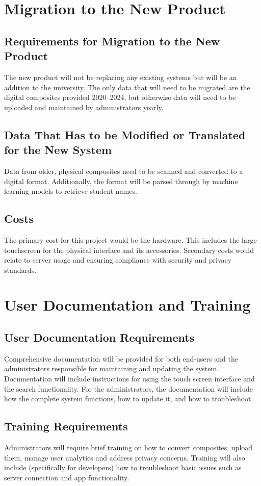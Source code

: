 \documentclass[12pt]{article}
\begin{document}
\section{Migration to the New Product}

\subsection*{Requirements for Migration to the New Product}
The new product will not be replacing any existing systems but will be an addition to the university. The only data that will need to be migrated are the digital composites provided 2020--2024, but otherwise data will need to be uploaded and maintained by administrators yearly.

\subsection*{Data That Has to be Modified or Translated for the New System}
Data from older, physical composites need to be scanned and converted to a digital format. Additionally, the format will be parsed through by machine learning models to retrieve student names.

\subsection*{Costs}
The primary cost for this project would be the hardware. This includes the large touchscreen for the physical interface and its accessories. Secondary costs would relate to server usage and ensuring compliance with security and privacy standards.

\section{User Documentation and Training}

\subsection*{User Documentation Requirements}
Comprehensive documentation will be provided for both end-users and the administrators responsible for maintaining and updating the system. Documentation will include instructions for using the touch screen interface and the search functionality. For the administrators, the documentation will include how the complete system functions, how to update it, and how to troubleshoot.

\subsection*{Training Requirements}
Administrators will require brief training on how to convert composites, upload them, manage user analytics and address privacy concerns. Training will also include (specifically for developers) how to troubleshoot basic issues such as server connection and app functionality.
\end{document}
